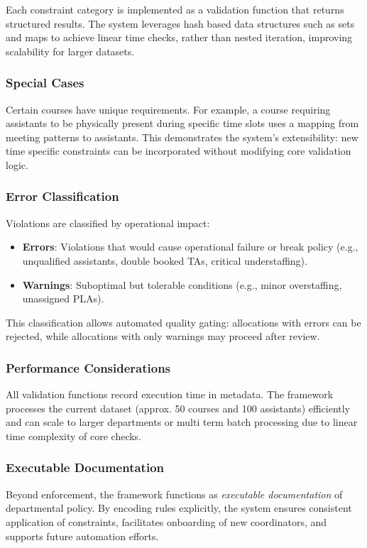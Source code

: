 Each constraint category is implemented as a validation function that returns structured results. The system leverages hash based data structures such as sets and maps to achieve linear time checks, rather than nested iteration, improving scalability for larger datasets.

\subsubsection{Special Cases}

Certain courses have unique requirements. For example, a course requiring assistants to be physically present during specific time slots uses a mapping from meeting patterns to assistants. This demonstrates the system's extensibility: new time specific constraints can be incorporated without modifying core validation logic.

\subsubsection{Error Classification}

Violations are classified by operational impact:
\begin{itemize}
    \item \textbf{Errors}: Violations that would cause operational failure or break policy (e.g., unqualified assistants, double booked TAs, critical understaffing).
    \item \textbf{Warnings}: Suboptimal but tolerable conditions (e.g., minor overstaffing, unassigned PLAs).
\end{itemize}

This classification allows automated quality gating: allocations with errors can be rejected, while allocations with only warnings may proceed after review.

\subsubsection{Performance Considerations}

All validation functions record execution time in metadata. The framework processes the current dataset (approx. 50 courses and 100 assistants) efficiently and can scale to larger departments or multi term batch processing due to linear time complexity of core checks.

\subsubsection{Executable Documentation}

Beyond enforcement, the framework functions as \textit{executable documentation} of departmental policy. By encoding rules explicitly, the system ensures consistent application of constraints, facilitates onboarding of new coordinators, and supports future automation efforts.